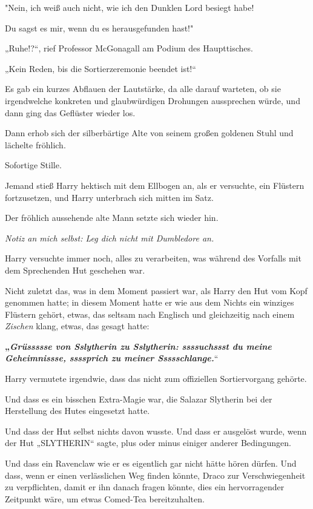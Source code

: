 {"Nein, ich weiß auch nicht, wie ich den Dunklen Lord besiegt habe!

Du sagst es mir, wenn du es herausgefunden hast!"

„Ruhe!?“, rief Professor McGonagall am Podium des Haupttisches.

„Kein Reden, bis die Sortierzeremonie beendet ist!“

Es gab ein kurzes Abflauen der Lautstärke, da alle darauf warteten, ob sie irgendwelche konkreten und glaubwürdigen Drohungen aussprechen würde, und dann ging das Geflüster wieder los.

Dann erhob sich der silberbärtige Alte von seinem großen goldenen Stuhl und lächelte fröhlich.

Sofortige Stille.

Jemand stieß Harry hektisch mit dem Ellbogen an, als er versuchte, ein Flüstern fortzusetzen, und Harry unterbrach sich mitten im Satz.

Der fröhlich aussehende alte Mann setzte sich wieder hin.

\emph{Notiz an mich selbst: Leg dich nicht mit Dumbledore an.}

Harry versuchte immer noch, alles zu verarbeiten, was während des Vorfalls mit dem Sprechenden Hut geschehen war.

Nicht zuletzt das, was in dem Moment passiert war, als Harry den Hut vom Kopf genommen hatte; in diesem Moment hatte er wie aus dem Nichts ein winziges Flüstern gehört, etwas, das seltsam nach Englisch und gleichzeitig nach einem \emph{Zischen} klang, etwas, das gesagt hatte:

\textbf{„\emph{Grüssssse von Sslytherin zu Sslytherin: ssssuchssst du meine Geheimnissse, ssssprich zu meiner Ssssschlange.}}“

Harry vermutete irgendwie, dass das nicht zum offiziellen Sortiervorgang gehörte.

Und dass es ein bisschen Extra-Magie war, die Salazar Slytherin bei der Herstellung des Hutes eingesetzt hatte.

Und dass der Hut selbst nichts davon wusste. Und dass er ausgelöst wurde, wenn der Hut „SLYTHERIN“ sagte, plus oder minus einiger anderer Bedingungen.

Und dass ein Ravenclaw wie er es eigentlich gar nicht hätte hören dürfen. Und dass, wenn er einen verlässlichen Weg finden könnte, Draco zur Verschwiegenheit zu verpflichten, damit er ihn danach fragen könnte, dies ein hervorragender Zeitpunkt wäre, um etwas Comed-Tea bereitzuhalten.

}
